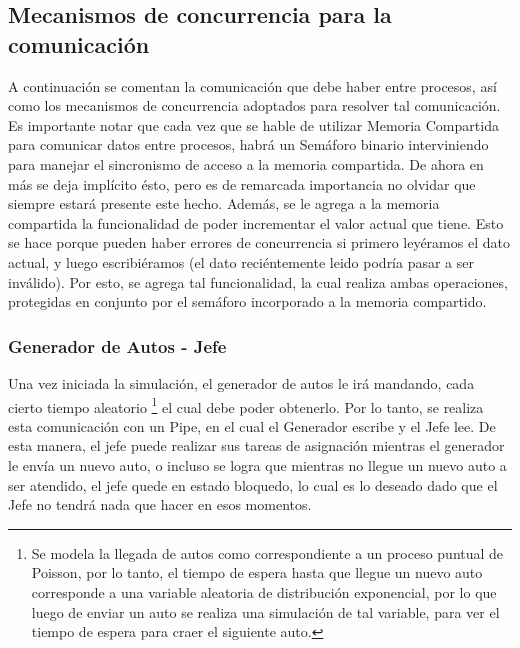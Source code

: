 \documentclass[a4paper,12pt]{article}
\begin{document}
\subsection{Mecanismos de concurrencia para la comunicación}
A continuación se comentan la comunicación que debe haber entre procesos, así como los mecanismos de concurrencia adoptados para resolver tal comunicación. Es importante notar que cada vez que se hable de utilizar Memoria Compartida para comunicar datos entre procesos, habrá un Semáforo binario interviniendo para manejar el sincronismo de acceso a la memoria compartida. De ahora en más se deja implícito ésto, pero es de remarcada importancia no olvidar que siempre estará presente este hecho. Además, se le agrega a la memoria compartida la funcionalidad de poder incrementar el valor actual que tiene. Esto se hace porque pueden haber errores de concurrencia si primero leyéramos el dato actual, y luego escribiéramos (el dato reciéntemente leido podría pasar a ser inválido). Por esto, se agrega tal funcionalidad, la cual realiza ambas operaciones, protegidas en conjunto por el semáforo incorporado a la memoria compartido. 

\subsubsection{Generador de Autos - Jefe}
Una vez iniciada la simulación, el generador de autos le irá mandando, cada cierto tiempo aleatorio \footnote{Se modela la llegada de autos como correspondiente a un proceso puntual de Poisson, por lo tanto, el tiempo de espera hasta que llegue un nuevo auto corresponde a una variable aleatoria de distribución exponencial, por lo que luego de enviar un auto se realiza una simulación de tal variable, para ver el tiempo de espera para craer el siguiente auto.}
el cual debe poder obtenerlo. Por lo tanto, se realiza esta comunicación con un Pipe, en el cual el Generador escribe y el Jefe lee. De esta manera, el jefe puede realizar sus tareas de asignación mientras el generador le envía un nuevo auto, o incluso se logra que mientras no llegue un nuevo auto a ser atendido, el jefe quede en estado bloquedo, lo cual es lo deseado dado que el Jefe no tendrá nada que hacer en esos momentos.
\end{document}
